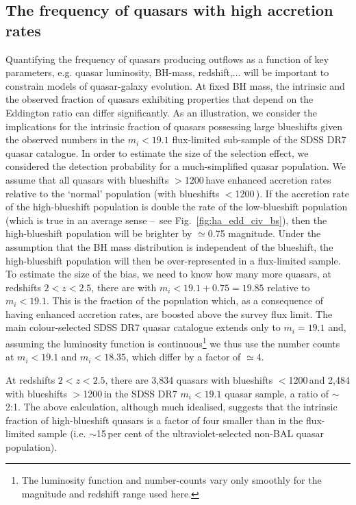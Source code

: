 \subsection{The frequency of quasars with high accretion rates}

Quantifying the frequency of quasars producing outflows as a function of key parameters, e.g. quasar luminosity, BH-mass, redshift,... will be important to constrain models of quasar-galaxy evolution.  
At fixed BH mass, the intrinsic and the observed fraction of quasars exhibiting properties that depend on the Eddington ratio can differ significantly. 
As an illustration, we consider the implications for the intrinsic fraction of quasars possessing large  blueshifts given the observed numbers in the $m_i<19.1$ flux-limited sub-sample of the SDSS DR7 quasar catalogue. 
In order to estimate the size of the selection effect, we considered the detection probability for a much-simplified quasar population. 
We assume that all quasars with  blueshifts $>$1200\,\kms have enhanced accretion rates relative to the `normal' population (with  blueshifts $<$1200\,\kms). 
If the accretion rate of the high-blueshift population is double the rate of the low-blueshift population (which is true in an average sense \---\ see Fig.~\ref{fig:ha_edd_civ_bs}), then the high-blueshift population will be brighter by $\simeq$0.75 magnitude.
Under the assumption that the BH mass distribution is independent of the  blueshift, the high-blueshift population will then be over-represented in a flux-limited sample.
To estimate the size of the bias, we need to know how many more quasars, at redshifts $2 < z < 2.5$, there are with $m_i<19.1+0.75=19.85$ relative to $m_i < 19.1$.
This is the fraction of the population which, as a consequence of having enhanced accretion rates, are boosted above the survey flux limit.    
The main colour-selected SDSS DR7 quasar catalogue extends only to $m_i= 19.1$ and, assuming the luminosity function is continuous\footnote{The luminosity function and number-counts vary only smoothly \citep[e.g.][]{ross13} for the magnitude and redshift range used here.} we thus use the number counts at $m_i < 19.1$ and $m_i < 18.35$, which differ by a factor of $\simeq 4$. 

At redshifts $2 < z <2.5$, there are 3,834 quasars with  blueshifts $<$1200\,\kms and 2,484 with blueshifts $>$1200\,\kms in the SDSS DR7 $m_i < 19.1$ quasar sample, a ratio of $\sim$2:1. 
The above calculation, although much idealised, suggests that the intrinsic fraction of high-blueshift quasars is a factor of four smaller than in the flux-limited sample (i.e. $\sim$15\,per cent of the ultraviolet-selected non-BAL quasar population). 

